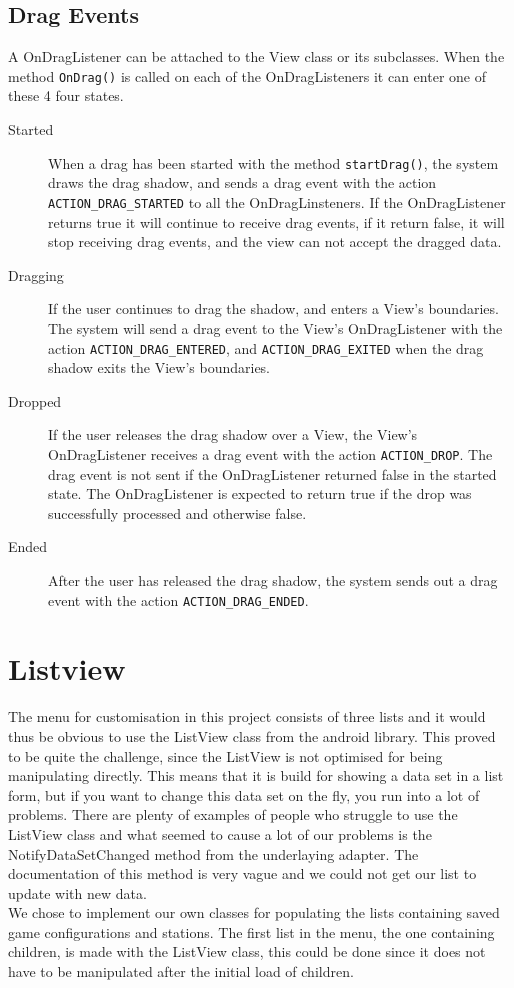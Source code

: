 \subsection*{Drag Events}
A OnDragListener can be attached to the View class or its subclasses. When the method \lstinline|OnDrag()| is called on each of the OnDragListeners it can enter one of these 4 four states.
\begin{description}
\item[Started] When a drag has been started with the method \lstinline|startDrag()|, the system draws the drag shadow, and sends a drag event with the action \lstinline|ACTION_DRAG_STARTED| to all the OnDragLinsteners. If the OnDragListener returns true it will continue to receive drag events, if it return false, it will stop receiving drag events, and the view can not accept the dragged data.

\item[Dragging] If the user continues to drag the shadow, and enters a View's boundaries. The system will send a drag event to the View's OnDragListener with the action \lstinline|ACTION_DRAG_ENTERED|, and \lstinline|ACTION_DRAG_EXITED| when the drag shadow exits the View's boundaries. 

\item[Dropped] If the user releases the drag shadow over a View, the View's OnDragListener receives a drag event with the action \lstinline|ACTION_DROP|. The drag event is not sent if the OnDragListener returned false in the started state. The OnDragListener is expected to return true if the drop was successfully processed and otherwise false.

\item[Ended] After the user has released the drag shadow, the system sends out a drag event with the action \lstinline|ACTION_DRAG_ENDED|.

\end{description}

\section{Listview}
The menu for customisation in this project consists of three lists and it would thus be obvious to use the ListView class from the android library\citep{androidlistview}. This proved to be quite the challenge, since the ListView is not optimised for being manipulating directly. This means that it is build for showing a data set in a list form, but if you want to change this data set on the fly, you run into a lot of problems. There are plenty of examples of people who struggle to use the ListView class\citep{listviewfail} and what seemed to cause a lot of our problems is the NotifyDataSetChanged method from the underlaying adapter\citep{notifydatasetchanged}. The documentation of this method is very vague and we could not get our list to update with new data.\\
We chose to implement our own classes for populating the lists containing saved game configurations and stations. The first list in the menu, the one containing children, is made with the ListView class, this could be done since it does not have to be manipulated after the initial load of children.
